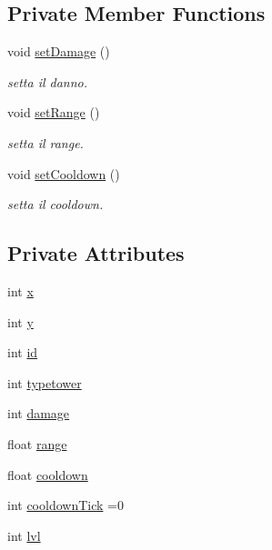 \subsection*{Private Member Functions}
\begin{DoxyCompactItemize}
\item 
void \hyperlink{classtowers_1_1_tower_a342d428cb4c655ed4d92a2c5be287e5d}{set\+Damage} ()
\begin{DoxyCompactList}\small\item\em setta il danno. \end{DoxyCompactList}\item 
void \hyperlink{classtowers_1_1_tower_abfc55d980923d42001e5aefda77849f9}{set\+Range} ()
\begin{DoxyCompactList}\small\item\em setta il range. \end{DoxyCompactList}\item 
void \hyperlink{classtowers_1_1_tower_a120aaa641fb05cbcbe27057048519fa7}{set\+Cooldown} ()
\begin{DoxyCompactList}\small\item\em setta il cooldown. \end{DoxyCompactList}\end{DoxyCompactItemize}
\subsection*{Private Attributes}
\begin{DoxyCompactItemize}
\item 
int \hyperlink{classtowers_1_1_tower_a6150e0515f7202e2fb518f7206ed97dc}{x}
\item 
int \hyperlink{classtowers_1_1_tower_a0a2f84ed7838f07779ae24c5a9086d33}{y}
\item 
int \hyperlink{classtowers_1_1_tower_a7441ef0865bcb3db9b8064dd7375c1ea}{id}
\item 
int \hyperlink{classtowers_1_1_tower_a2115b9e9ed7b8b8288b5dae468cbd784}{typetower}
\item 
int \hyperlink{classtowers_1_1_tower_a9b39867abc3f09243fcdc739bd9e6c90}{damage}
\item 
float \hyperlink{classtowers_1_1_tower_a3930d1e8af0848833f4de0e0e9517dca}{range}
\item 
float \hyperlink{classtowers_1_1_tower_aca09286cd8b3d4183f0d74bad38fff6e}{cooldown}
\item 
int \hyperlink{classtowers_1_1_tower_a6ca2c1cd069b9dc0b126f8158fe07068}{cooldown\+Tick} =0
\item 
int \hyperlink{classtowers_1_1_tower_a6c7f440bf2fb555abdc789a41c6acf44}{lvl}
\end{DoxyCompactItemize}


